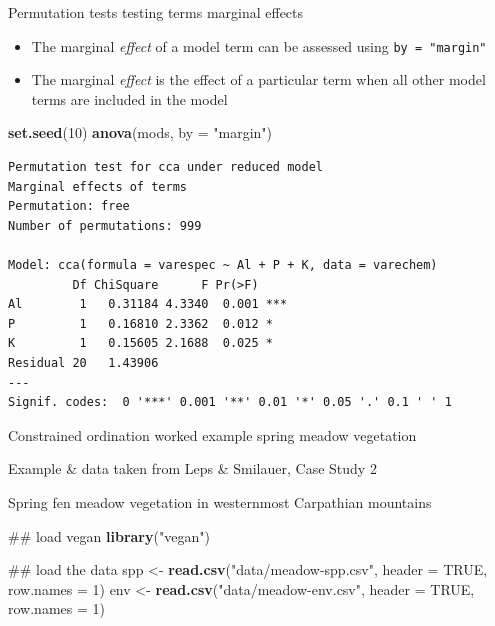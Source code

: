\documentclass[10pt,ignorenonframetext,compress, aspectratio=169]{beamer}
\newenvironment{Shaded}{\begin{snugshade}}{\end{snugshade}}
\newcommand{\KeywordTok}[1]{\textcolor[rgb]{0.13,0.29,0.53}{\textbf{{#1}}}}
\newcommand{\DataTypeTok}[1]{\textcolor[rgb]{0.13,0.29,0.53}{{#1}}}
\newcommand{\DecValTok}[1]{\textcolor[rgb]{0.00,0.00,0.81}{{#1}}}
\newcommand{\StringTok}[1]{\textcolor[rgb]{0.31,0.60,0.02}{{#1}}}
\newcommand{\OtherTok}[1]{\textcolor[rgb]{0.56,0.35,0.01}{{#1}}}
\newcommand{\NormalTok}[1]{{#1}}
\begin{document}
\begin{frame}[fragile]{Permutation tests \textbar{} testing terms
marginal effects}

\begin{itemize}
\itemsep1pt\parskip0pt
\item
  The marginal \emph{effect} of a model term can be assessed using
  \texttt{by = "margin"}
\item
  The marginal \emph{effect} is the effect of a particular term when all
  other model terms are included in the model
\end{itemize}

\tiny

\begin{Shaded}
\begin{Highlighting}[]
\KeywordTok{set.seed}\NormalTok{(}\DecValTok{10}\NormalTok{)}
\KeywordTok{anova}\NormalTok{(mods, }\DataTypeTok{by =} \StringTok{"margin"}\NormalTok{)}
\end{Highlighting}
\end{Shaded}

\begin{verbatim}
Permutation test for cca under reduced model
Marginal effects of terms
Permutation: free
Number of permutations: 999

Model: cca(formula = varespec ~ Al + P + K, data = varechem)
         Df ChiSquare      F Pr(>F)    
Al        1   0.31184 4.3340  0.001 ***
P         1   0.16810 2.3362  0.012 *  
K         1   0.15605 2.1688  0.025 *  
Residual 20   1.43906                  
---
Signif. codes:  0 '***' 0.001 '**' 0.01 '*' 0.05 '.' 0.1 ' ' 1
\end{verbatim}

\normalsize

\end{frame}

\begin{frame}[fragile]{Constrained ordination worked example \textbar{}
spring meadow vegetation}

Example \& data taken from Leps \& Smilauer, Case Study 2

Spring fen meadow vegetation in westernmost Carpathian mountains

\scriptsize

\begin{Shaded}
\begin{Highlighting}[]
\NormalTok{## load vegan}
\KeywordTok{library}\NormalTok{(}\StringTok{"vegan"}\NormalTok{)}

\NormalTok{## load the data}
\NormalTok{spp <-}\StringTok{ }\KeywordTok{read.csv}\NormalTok{(}\StringTok{"data/meadow-spp.csv"}\NormalTok{, }\DataTypeTok{header =} \OtherTok{TRUE}\NormalTok{, }\DataTypeTok{row.names =} \DecValTok{1}\NormalTok{)}
\NormalTok{env <-}\StringTok{ }\KeywordTok{read.csv}\NormalTok{(}\StringTok{"data/meadow-env.csv"}\NormalTok{, }\DataTypeTok{header =} \OtherTok{TRUE}\NormalTok{, }\DataTypeTok{row.names =} \DecValTok{1}\NormalTok{)}
\end{Highlighting}
\end{Shaded}

\normalsize

\end{frame}
\end{document}
